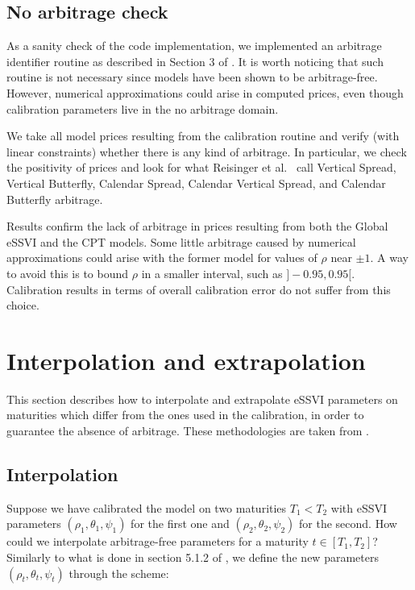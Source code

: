 \documentclass{article}
\begin{document}
	\hypertarget{no-arbitrage-check}{%
\subsection{No arbitrage check}\label{no-arbitrage-check}}

	As a sanity check of the code implementation, we implemented an
arbitrage identifier routine as described in Section 3 of
\cite{cohen2020detecting}. It is worth noticing that such routine is not
necessary since models have been shown to be arbitrage-free. However,
numerical approximations could arise in computed prices, even though
calibration parameters live in the no arbitrage domain.

We take all model prices resulting from the calibration routine and
verify (with linear constraints) whether there is any kind of arbitrage.
In particular, we check the positivity of prices and look for what
Reisinger et al.~\cite{cohen2020detecting} call Vertical Spread,
Vertical Butterfly, Calendar Spread, Calendar Vertical Spread, and
Calendar Butterfly arbitrage.

Results confirm the lack of arbitrage in prices resulting from both the
Global eSSVI and the CPT models. Some little arbitrage caused by
numerical approximations could arise with the former model for values of
\(\rho\) near \(\pm1\). A way to avoid this is to bound \(\rho\) in a
smaller interval, such as \(]-0.95,0.95[\). Calibration results in terms
of overall calibration error do not suffer from this choice.

	\hypertarget{interpolation-and-extrapolation}{%
\section{Interpolation and
extrapolation}\label{interpolation-and-extrapolation}}

	This section describes how to interpolate and extrapolate eSSVI
parameters on maturities which differ from the ones used in the
calibration, in order to guarantee the absence of arbitrage. These
methodologies are taken from \cite{corbetta2019robust}.

	\hypertarget{interpolation}{%
\subsection{Interpolation}\label{interpolation}}

	Suppose we have calibrated the model on two maturities \(T_1<T_2\) with
eSSVI parameters \((\rho_1,\theta_1,\psi_1)\) for the first one and
\((\rho_2,\theta_2,\psi_2)\) for the second. How could we interpolate
arbitrage-free parameters for a maturity \(t\in[T_1,T_2]\)? Similarly to
what is done in section 5.1.2 of \cite{corbetta2019robust}, we define
the new parameters \((\rho_t,\theta_t,\psi_t)\) through the scheme:
\end{document}
